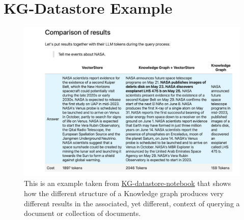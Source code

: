 \section{KG-Datastore Example}
\begin{figure}[h]
  \centering
  \includegraphics[width=16cm]{images/kg-datastore-example.jpeg}
  \caption{This is an example taken from
  \href{https://github.com/run-llama/llama_index/blob/main/docs/examples/index_structs/knowledge_graph/KnowledgeGraphIndex_vs_VectorStoreIndex_vs_CustomIndex_combined.ipynb}{KG-datastore-notebook}
that shows how the different structure of a Knowledge graph produces very
different results in the associated, yet different, context of querying a
document or collection of documents.}
  \label{fig-kg-datastore-example}
\end{figure}

